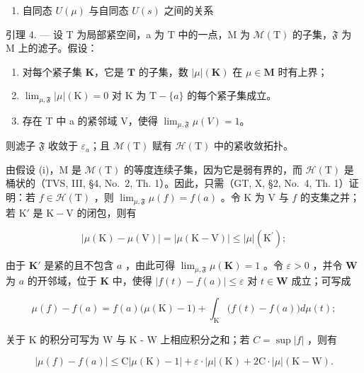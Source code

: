 \begin{enumerate}
\def\labelenumi{\arabic{enumi}.}
\setcounter{enumi}{6}
\tightlist
\item
  自同态 \(U(\mu)\) 与自同态 \(U(s)\) 之间的关系
\end{enumerate}

引理 4. --- 设 T 为局部紧空间，a 为 T 中的一点，M 为 \(\mathcal{M}(\mathrm{T})\) 的子集，\(\mathfrak{F}\) 为 M 上的滤子。假设：

\begin{enumerate}
\def\labelenumi{(\roman{enumi})}
\item
  对每个紧子集 \(\mathbf{K}\)，它是 \(\mathbf{T}\) 的子集，数 \(|\mu|(\mathbf{K})\) 在 \(\mu \in \mathbf{M}\) 时有上界；
\item
  \(\lim_{\mu, \mathfrak{F}} |\mu| (\mathrm{K}) = 0\) 对 \(\mathrm{K}\) 为 \(\mathrm{T} - \{a\}\) 的每个紧子集成立。
\item
  存在 T 中 a 的紧邻域 V，使得 \(\lim_{\mu, \mathfrak{F}} \mu(V) = 1\)。
\end{enumerate}

则滤子 \(\mathfrak{F}\) 收敛于 \(\varepsilon_{a}\)；且 \(\mathcal{M}(\mathrm{T})\) 赋有 \(\mathcal{H}(\mathrm{T})\) 中的紧收敛拓扑。

由假设 (i)，M 是 \(\mathcal{M}(\mathrm{T})\) 的等度连续子集，因为它是弱有界的，而 \(\mathcal{H}(\mathrm{T})\) 是桶状的（TVS, III, §4, No.~2, Th. 1）。因此，只需（GT, X, §2, No.~4, Th. 1）证明：若 \(f \in \mathcal{H}(\mathrm{T})\) ，则 \(\lim_{\mu, \mathfrak{F}} \mu(f) = f(a)\) 。令 K 为 V 与 \(f\) 的支集之并；若 \(\mathrm{K}'\) 是 \(\mathrm{K} - \mathrm{V}\) 的闭包，则有

\[
| \mu (\mathrm{K}) - \mu (\mathrm{V}) | = | \mu (\mathrm{K} - \mathrm{V}) | \leqslant | \mu | (\mathrm{K} ^ {\prime});
\]

由于 \(\mathbf{K}'\) 是紧的且不包含 \(a\) ，由此可得 \(\lim_{\mu, \mathfrak{F}} \mu(\mathbf{K}) = 1\) 。令 \(\varepsilon > 0\) ，并令 \(\mathbf{W}\) 为 \(a\) 的开邻域，位于 \(\mathbf{K}\) 中，使得 \(|f(t) - f(a)| \leqslant \varepsilon\) 对 \(t \in \mathbf{W}\) 成立；可写成

\[
\mu (f) - f (a) = f (a) \big (\mu (\mathrm{K}) - 1 \big) + \int_ {\mathrm{K}} \big (f (t) - f (a) \big) d \mu (t);
\]

关于 K 的积分可写为 W 与 K - W 上相应积分之和；若 \(C = \sup |f|\) ，则有

\[
| \mu (f) - f (a) | \leqslant \mathrm{C} | \mu (\mathrm{K}) - 1 | + \varepsilon \cdot | \mu | (\mathrm{K}) + 2 \mathrm{C} \cdot | \mu | (\mathrm{K} - \mathrm{W}).
\]

